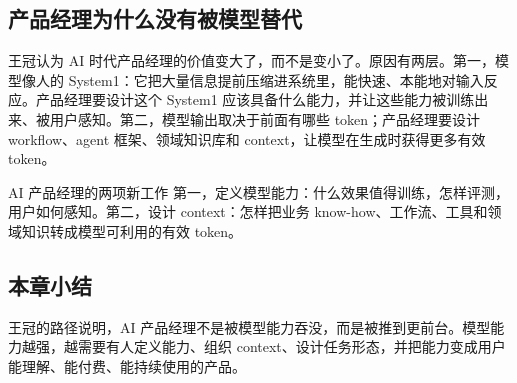 \subsection{产品经理为什么没有被模型替代}

王冠认为 AI 时代产品经理的价值变大了，而不是变小了。原因有两层。第一，模型像人的 System1：它把大量信息提前压缩进系统里，能快速、本能地对输入反应。产品经理要设计这个 System1 应该具备什么能力，并让这些能力被训练出来、被用户感知。第二，模型输出取决于前面有哪些 token；产品经理要设计 workflow、agent 框架、领域知识库和 context，让模型在生成时获得更多有效 token。

\begin{importantbox}{AI 产品经理的两项新工作}
第一，定义模型能力：什么效果值得训练，怎样评测，用户如何感知。第二，设计 context：怎样把业务 know-how、工作流、工具和领域知识转成模型可利用的有效 token。
\end{importantbox}

\subsection{本章小结}

王冠的路径说明，AI 产品经理不是被模型能力吞没，而是被推到更前台。模型能力越强，越需要有人定义能力、组织 context、设计任务形态，并把能力变成用户能理解、能付费、能持续使用的产品。

